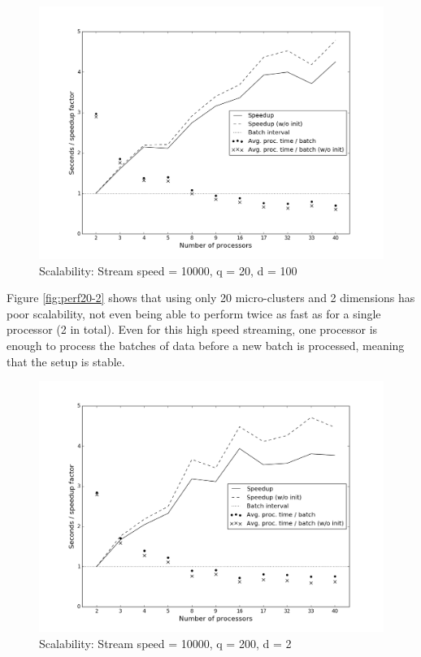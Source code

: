 \begin{figure}[h!]
 \centering
 \includegraphics[scale=0.4]{./styles/perf20-100.png}
 \caption{Scalability: Stream speed = 10000, q = 20, d = 100}
 \label{fig:perf20-100}
\end{figure}


Figure \ref{fig:perf20-2} shows that using only 20 micro-clusters and 2 dimensions has poor scalability, not even being able to perform twice as fast as for a single processor (2 in total). Even for this high speed streaming, one processor is enough to process the batches of data before a new batch is processed, meaning that the setup is stable.

\begin{figure}[h!]
 \centering
 \includegraphics[scale=0.42]{./styles/perf200-2.png}
 \caption{Scalability: Stream speed = 10000, q = 200, d = 2}
 \label{fig:perf200-2}
\end{figure}

